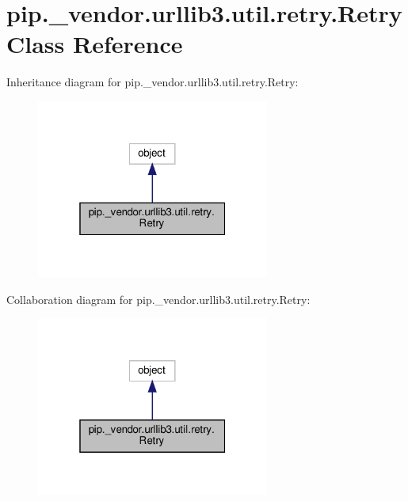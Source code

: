 \hypertarget{classpip_1_1__vendor_1_1urllib3_1_1util_1_1retry_1_1Retry}{}\section{pip.\+\_\+vendor.\+urllib3.\+util.\+retry.\+Retry Class Reference}
\label{classpip_1_1__vendor_1_1urllib3_1_1util_1_1retry_1_1Retry}


Inheritance diagram for pip.\+\_\+vendor.\+urllib3.\+util.\+retry.\+Retry\+:
\nopagebreak
\begin{figure}[H]
\begin{center}
\leavevmode
\includegraphics[width=217pt]{classpip_1_1__vendor_1_1urllib3_1_1util_1_1retry_1_1Retry__inherit__graph}
\end{center}
\end{figure}


Collaboration diagram for pip.\+\_\+vendor.\+urllib3.\+util.\+retry.\+Retry\+:
\nopagebreak
\begin{figure}[H]
\begin{center}
\leavevmode
\includegraphics[width=217pt]{classpip_1_1__vendor_1_1urllib3_1_1util_1_1retry_1_1Retry__coll__graph}
\end{center}
\end{figure}
